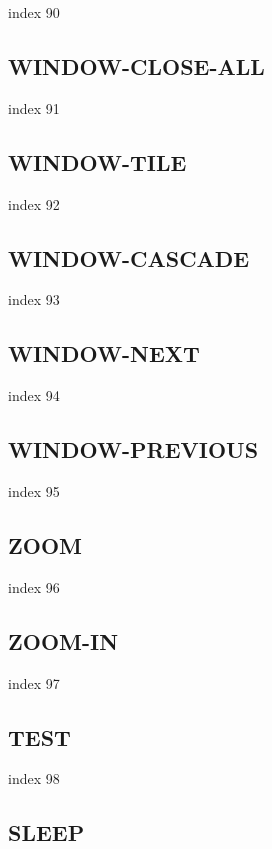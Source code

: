 \documentclass[a4paper]{report}
\begin{document}
index 90

\subsection{WINDOW-CLOSE-ALL}

index 91

\subsection{WINDOW-TILE}

index 92

\subsection{WINDOW-CASCADE}

index 93

\subsection{WINDOW-NEXT}

index 94

\subsection{WINDOW-PREVIOUS}

index 95

\subsection{ZOOM}

 index 96

\subsection{ZOOM-IN}

index 97

\subsection{TEST}

 index 98

\subsection{SLEEP}
\end{document}
